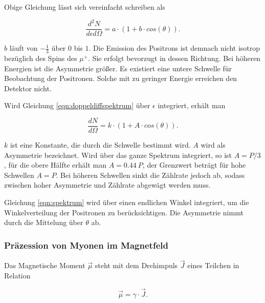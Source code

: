 \documentclass[a4paper,ngerman]{scrartcl}
\begin{document}
Obige Gleichung lässt sich vereinfacht schreiben als

\begin{equation}
\frac{d^2N}{d\epsilon d\Omega} = a \cdot (1 + b \cdot cos(\theta) ) .
\end{equation}

$b$ läuft von $-\frac{1}{3}$ über $0$ bis $1$. Die Emission des Positrons ist demnach nicht isotrop bezüglich des Spins des $\mu^{+}$. Sie erfolgt bevorzugt in dessen Richtung. Bei höheren Energien ist die Asymmetrie größer. Es existiert eine untere Schwelle für Beobachtung der Positronen. Solche mit zu geringer Energie erreichen den Detektor nicht. 

Wird Gleichung \ref{eqn:doppeldiffspektrum} über $\epsilon$ integriert, erhält man

\begin{equation}
\label{eqn:spektrum}
\frac{dN}{ d\Omega} = k \cdot (1 + A \cdot cos(\theta) ).
\end{equation}

$k$ ist eine Konstante, die durch die Schwelle bestimmt wird. $A$ wird als Asymmetrie bezeichnet. Wird über das ganze Spektrum integriert, so ist $A=P/3$, für die obere Hälfte erhält man $A = 0.44 \ P$, der Grenzwert beträgt für hohe Schwellen $A=P$. Bei höheren Schwellen sinkt die Zählrate jedoch ab, sodass zwischen hoher Asymmetrie und Zählrate abgewägt werden muss.

Gleichung \ref{eqn:spektrum} wird über einen endlichen Winkel integriert, um die Winkelverteilung der Positronen zu berücksichtigen. Die Asymmetrie nimmt durch die Mittelung über $\theta$ ab.







\subsubsection{Präzession von Myonen im Magnetfeld}
\label{sec:prazission}

Das Magnetische Moment $\vec{\mu}$ steht mit dem Drehimpuls $\vec{J}$ eines Teilchen in Relation

\begin{equation}
\vec{\mu} = \gamma \cdot \vec{J} .
\end{equation}
\end{document}
